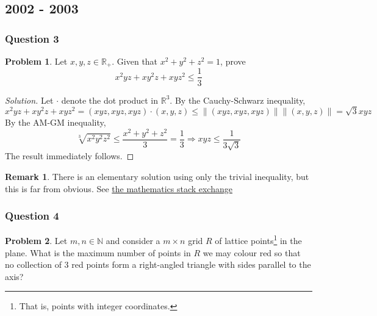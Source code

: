 \documentclass[11pt]{article}
\theoremstyle{definition}
\newtheorem*{problem}{Problem}
\newtheorem*{remark}{Remark}
\begin{document}
\subsection{2002 - 2003}

\subsubsection{Question 3}

\begin{problem}
  Let $x, y, z \in \mathbb{R}_+$. Given that $x^2 + y^2 + z^2 = 1$, prove 
  \[x^2 yz + xy^2 z + xyz^2 \leq \frac{1}{3}\]
\end{problem}

\begin{proof}[Solution]
  Let $\cdot$ denote the dot product in $\mathbb{R}^3$. By the Cauchy-Schwarz inequality,
  \[x^2 y z + xy^2 z + xyz^2 = (xyz, xyz, xyz) \cdot (x,y,z) \leq \lVert (xyz,xyz,xyz) \rVert \lVert (x,y,z) \rVert 
  = \sqrt{3}xyz\] 
  By the AM-GM inequality, 
  \[\sqrt[3]{x^2y^2z^2} \leq \frac{x^2 + y^2 + z^2}{3} = \frac{1}{3} \Longrightarrow xyz \leq \frac{1}{3\sqrt{3}}\]
  The result immediately follows. 
\end{proof}

\begin{remark}
  There is an elementary solution using only the trivial inequality, but this is far from obvious. See 
  \href{https://math.stackexchange.com/questions/2757796/british-maths-olympiad-bmo-2002-round-1-question-3-proof-without-cauchy-schwar}{the mathematics stack exchange}
\end{remark}

\newpage

\subsubsection{Question 4}

\begin{problem}
  Let $m, n \in \mathbb{N}$ and consider a $m \times n$ grid $R$ of lattice points\footnote{
    That is, points with integer coordinates.
  } in the plane. What is the maximum number of points in $R$ we may colour red so that no collection of $3$ red 
  points form a right-angled triangle with sides parallel to the axis?
\end{problem}
\end{document}

